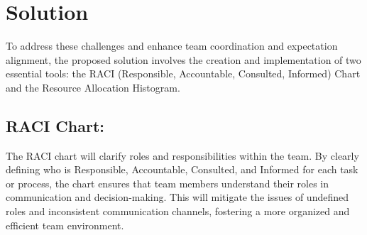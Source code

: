 \documentclass[12pt,titlepage,a4paper]{report}
\begin{document}
    \section{Solution}
    To address these challenges and enhance team coordination and expectation alignment, the proposed solution involves the creation and implementation of two essential tools: the RACI (Responsible, Accountable, Consulted, Informed) Chart and the Resource Allocation Histogram.
    \newpage
        \subsection{RACI Chart:}
        The RACI chart will clarify roles and responsibilities within the team. By clearly defining who is Responsible, Accountable, Consulted, and Informed for each task or process, the chart ensures that team members understand their roles in communication and decision-making. This will mitigate the issues of undefined roles and inconsistent communication channels, fostering a more organized and efficient team environment.
\end{document}
